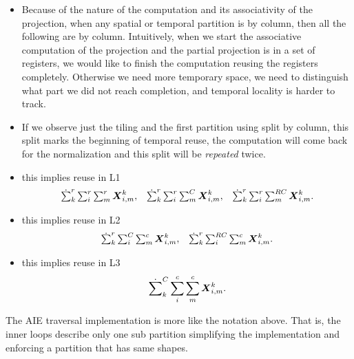\documentclass[acmsmall]{acmart}
\begin{document}
\begin{itemize}
\item Because of the nature of the computation and its associativity
  of the projection, when any spatial or temporal partition is by
  column, then all the following are by column. Intuitively, when we
  start the associative computation of the projection and the partial
  projection is in a set of registers, we would like to finish the
  computation reusing the registers completely. Otherwise we need more
  temporary space, we need to distinguish what part we did not reach
  completion, and temporal locality is harder to track.
\item If we observe just the tiling and the first partition using
  split by column, this split marks the beginning of temporal reuse,
  the computation will come back for the normalization and this split
  will be {\em repeated} twice.

\item this implies reuse in L1 
  \begin{equation}
    \begin{matrix}
    \dot\sum_k^r\sum_{i}^r\sum_{m}^r{\boldsymbol X}^{k}_{i,m}, & 
    \dot\sum_k^r\sum_{i}^r\sum_{m}^C{\boldsymbol X}^{k}_{i,m}, & 
    \dot\sum_k^r\sum_{i}^r\sum_{m}^{RC}{\boldsymbol X}^{k}_{i,m}. \\
    \end{matrix}
  \end{equation}
  
\item   this implies reuse in L2
  \begin{equation}
    \begin{matrix}
    \dot\sum_k^r\sum_{i}^{C}\sum_{m}^c{\boldsymbol X}^{k}_{i,m}, & 
    \dot\sum_k^r\sum_{i}^{RC}\sum_{m}^c{\boldsymbol X}^{k}_{i,m}. \\
    \end{matrix}
  \end{equation}

\item   this implies reuse in L3 
  \begin{equation}
    \dot\sum_k^{C}\sum_{i}^c\sum_{m}^c{\boldsymbol X}^{k}_{i,m}.
  \end{equation}
\end{itemize}

The AIE traversal implementation is more like the notation above. That
is, the inner loops describe only one sub partition simplifying the
implementation and enforcing a partition that has same shapes.
\end{document}
